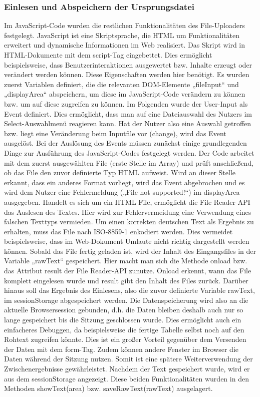 {\subsubsection{Einlesen und Abspeichern der Ursprungsdatei}
Im JavaScript-Code wurden die restlichen Funktionalitäten des File-Uploaders festgelegt. JavaScript ist eine Skriptsprache, die HTML um Funktionalitäten erweitert und dynamische Informationen im Web realisiert. Das Skript wird in HTML-Dokumente mit dem script-Tag eingebettet. Dies ermöglicht beispielsweise, dass Benutzerinteraktionen ausgewertet bzw. Inhalte erzeugt oder verändert werden können. Diese Eigenschaften werden hier benötigt. 
Es wurden zuerst Variablen definiert, die die relevanten DOM-Elemente „fileInput“ und „displayArea“ abspeichern, um diese im JavaScript-Code verändern zu können bzw. um auf diese zugreifen zu können. 
Im Folgenden wurde der User-Input als Event definiert. Dies ermöglicht, dass man auf eine Dateiauswahl des Nutzers im Select-Auswahlmenü reagieren kann. Hat der Nutzer also eine Auswahl getroffen bzw. liegt eine Veränderung beim Inputfile vor (change), wird das Event ausgelöst. Bei der Auslösung des Events müssen zunächst einige grundlegenden Dinge zur Ausführung des JavaScript-Codes festgelegt werden. 
Der Code arbeitet mit dem zuerst ausgewählten File (erste Stelle im Array) und prüft anschließend, ob das File den zuvor definierte Typ HTML aufweist. Wird an dieser Stelle erkannt, dass ein anderes Format vorliegt, wird das Event abgebrochen und es wird dem Nutzer eine Fehlermeldung („File not supported!“) im displayArea ausgegeben. 
Handelt es sich um ein HTML-File, ermöglicht die File Reader-\ac{API} das Auslesen des Textes. Hier wird zur Fehlervermeidung eine Verwendung eines falschen Texttyps vermieden. Um einen korrekten deutschen Text als Ergebnis zu erhalten, muss das File nach ISO-8859-1 enkodiert werden. Dies vermeidet beispielsweise, dass im Web-Dokument Umlaute nicht richtig dargestellt werden können. Sobald das File fertig geladen ist, wird der Inhalt des Eingangsfiles in der Variable „rawText“ gespeichert. Hier macht man sich die Methode onload bzw. das Attribut result der File Reader-API zunutze. Onload erkennt, wann das File komplett eingelesen wurde und result gibt den Inhalt des Files zurück. Darüber hinaus soll das Ergebnis des Einlesens, also die zuvor definierte Variable rawText, im sessionStorage abgespeichert werden. Die Datenspeicherung wird also an die aktuelle Browsersession gebunden, d.h. die Daten bleiben deshalb auch nur so lange gespeichert bis die Sitzung geschlossen wurde. Dies ermöglicht auch ein einfacheres Debuggen, da beispielsweise die fertige Tabelle selbst noch auf den Rohtext zugreifen könnte. Dies ist ein großer Vorteil gegenüber dem Versenden der Daten mit dem form-Tag. Zudem können andere Fenster im Browser die Daten während der Sitzung nutzen. Somit ist eine spätere Weiterverwendung der Zwischenergebnisse gewährleistet. Nachdem der Text gespeichert wurde, wird er aus dem sessionStorage angezeigt. Diese beiden Funktionalitäten wurden in den Methoden showText(area) bzw. saveRawText(rawText) ausgelagert. \\
}

